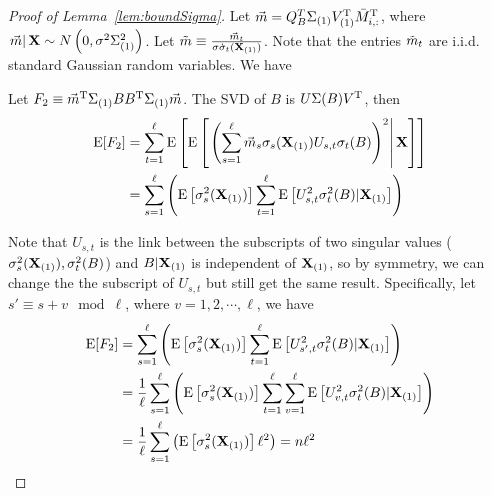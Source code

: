 \begin{proof}[Proof of Lemma~\ref{lem:boundSigma}]
Let $\vec m = Q^{T}_{B} \Sigma_{(1)}V^{\mathrm{T}}_{(1)} \bar M^{\mathrm{T}}_{i,:}$, where $\left. \vec m  \right| \mathbf{X} \sim N\left(0, \sigma^2 \Sigma^2_{(1)}\right)$. Let $\Tilde{m} \equiv \frac{\vec m_{t}}{\sigma \dot \sigma_t(\mathbf{X}_{(1)})}$. Note that the entries $\Tilde{m}_t$ are i.i.d. standard Gaussian random variables. We have 
\fi


Let $F_2 \equiv \vec m^{\mathrm{T}}\Sigma_{(1)}B B^{\mathrm{T}}\Sigma_{(1)}\vec m$. The SVD of $B$ is $U\Sigma(B)V^{\mathrm{T}}$, then
\begin{equation} \label{eqn:expect_F2}
\begin{split}
     \mathrm{E}[F_2]
     &= \sum^{\ell}_{t=1} \mathrm{E}\left[\mathrm{E}\left[\left.\left(\sum^{\ell}_{s=1}\vec m_s \sigma_s(\mathbf{X}_{(1)})U_{s,t}\sigma_t(B)\right)^2 \right| \mathbf{X} \right]\right] \\ 
     &= \sum^{\ell}_{s=1} \left( \mathrm{E}\left[\sigma^2_s(\mathbf{X}_{(1)}) \right]\sum^{\ell}_{t=1} \mathrm{E}\left[U^2_{s,t}\sigma^2_t(B)|\mathbf{X}_{(1)} \right]\right)  
\end{split}
\end{equation}

Note that $U_{s,t}$ is the link between the subscripts of two singular values ($\sigma^2_s(\mathbf{X}_{(1)}),\sigma^2_t(B)$) and $B|\mathbf{X}_{(1)}$ is independent of $\mathbf{X}_{(1)}$, so by symmetry, we can change the the subscript of $U_{s,t}$ but still get the same result. Specifically,
let $s' \equiv s + v \mod \ell$, where $v = 1,2,\cdots, \ell$, we have
\begin{equation} \label{eqn:expect_n}
\begin{split}
    \mathrm{E}[F_2] 
    &= \sum^{\ell}_{s=1} \left( \mathrm{E}\left[\sigma^2_s(\mathbf{X}_{(1)}) \right]\sum^{\ell}_{t=1} \mathrm{E}\left[U^2_{s',t}\sigma^2_t(B)|\mathbf{X}_{(1)} \right]\right) \\ 
    &= \frac{1}{\ell} \sum^{\ell}_{s=1} \left( \mathrm{E}\left[\sigma^2_s(\mathbf{X}_{(1)}) \right]\sum^{\ell}_{t=1}\sum^{\ell}_{v=1} \mathrm{E}\left[U^2_{v,t}\sigma^2_t(B)|\mathbf{X}_{(1)} \right]\right) \\ 
    &= \frac{1}{\ell} \sum^{\ell}_{s=1} \left( \mathrm{E}\left[\sigma^2_s(\mathbf{X}_{(1)}) \right]\ell^2 \right) 
    = n\ell^2
\end{split}
\end{equation}


\end{proof}
